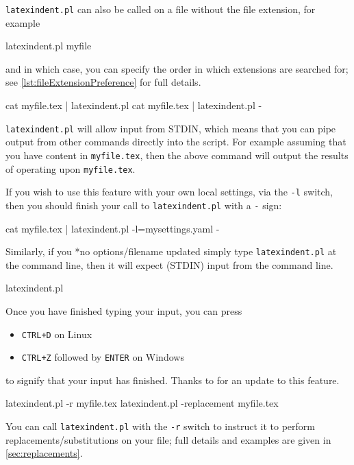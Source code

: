 	\texttt{latexindent.pl} can also be called on a file without the file extension, for
	example
	\begin{commandshell}
latexindent.pl myfile
\end{commandshell}
	and in which case, you can specify the order in which extensions are searched for; see
	\vref{lst:fileExtensionPreference} for full details. 
	\begin{commandshell}
cat myfile.tex | latexindent.pl
cat myfile.tex | latexindent.pl -
\end{commandshell}
	\texttt{latexindent.pl} will%
	 allow input from STDIN, which means that you can
	pipe output from other commands directly into the script. For example assuming that you
	have content in \texttt{myfile.tex}, then the above command will output the results of
	operating upon \texttt{myfile.tex}.

	If you wish to use this feature with your own local settings, via the \texttt{-l} switch,
	then you should finish your call to \texttt{latexindent.pl} with a \texttt{-} sign:
	\begin{commandshell}
cat myfile.tex | latexindent.pl -l=mysettings.yaml -
\end{commandshell}

	Similarly, if you *{no options/filename updated} simply type
	\texttt{latexindent.pl} at the command line, then it will expect (STDIN) input from the
	command line.%
	\begin{commandshell}
latexindent.pl
\end{commandshell}

	Once you have finished typing your input, you can press
	\begin{itemize}
		\item \texttt{CTRL+D} on Linux
		\item \texttt{CTRL+Z} followed by \texttt{ENTER} on Windows
	\end{itemize}
	to signify that your input has finished. Thanks to \cite{xu-cheng} for an update to this
	feature.
	\begin{commandshell}
latexindent.pl -r myfile.tex
latexindent.pl -replacement myfile.tex
\end{commandshell}
	You can  call \texttt{latexindent.pl} with
	the \texttt{-r} switch to instruct it to perform replacements/substitutions on your file;
	full details and examples are given in \vref{sec:replacements}. %

